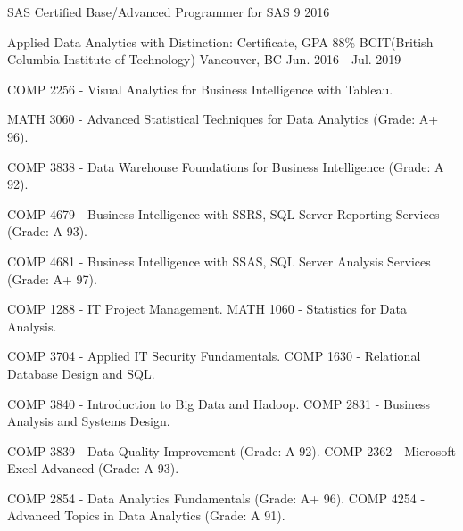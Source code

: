 \documentclass[11pt, a4paper]{awesome-cv}
\begin{document}
\begin{cvhonors}

  \cvhonor
    {SAS Certified Base/Advanced Programmer for SAS 9} %
    {} %
    {} %
    {2016} %

\end{cvhonors}



\begin{cventries}

  \cventry
    {Applied Data Analytics with Distinction: Certificate, GPA 88\%} %
    {BCIT(British Columbia Institute of Technology)} %
    {Vancouver, BC} %
    {Jun. 2016 - Jul. 2019} %
    {
      \begin{cvitems} %
        \item {COMP 2256 - Visual Analytics for Business Intelligence with Tableau.}
        \item {MATH 3060 - Advanced Statistical Techniques for Data Analytics (Grade: A+ 96).}
        \item {COMP 3838 - Data Warehouse Foundations for Business Intelligence (Grade: A 92).}
        \item {COMP 4679 - Business Intelligence with SSRS, SQL Server Reporting Services (Grade: A 93).}
        \item {COMP 4681 - Business Intelligence with SSAS, SQL Server Analysis Services (Grade: A+ 97).}
        \item {COMP 1288 - IT Project Management. MATH 1060 - Statistics for Data Analysis.}
        \item {COMP 3704 - Applied IT Security Fundamentals. COMP 1630 - Relational Database Design and SQL.}
        \item {COMP 3840 - Introduction to Big Data and Hadoop. COMP 2831 - Business Analysis and Systems Design.}
        \item {COMP 3839 - Data Quality Improvement (Grade: A 92). COMP 2362 - Microsoft Excel Advanced (Grade: A 93).}
        \item {COMP 2854 - Data Analytics Fundamentals (Grade: A+ 96). COMP 4254 - Advanced Topics in Data Analytics (Grade: A 91).}
      \end{cvitems}
    }

\end{cventries}
\end{document}
